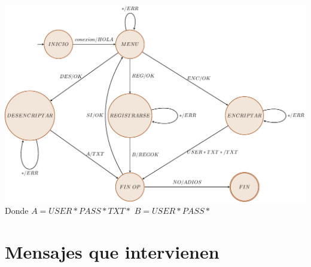 \documentclass[11pt]{article}
\begin{document}
\includegraphics[width=15cm]{../pdf/diagrama.pdf}
	Donde $A=USER*PASS*TXT*$ \quad $B=USER*PASS*$ 
\newpage

\section{Mensajes que intervienen}
\end{document}
